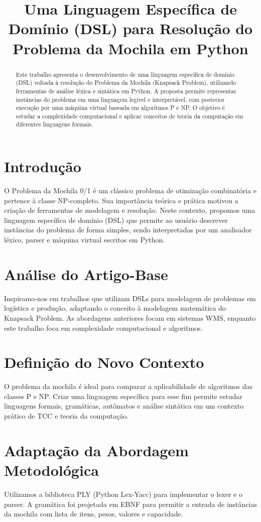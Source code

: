 \documentclass[conference]{IEEEtran}
\title{Uma Linguagem Específica de Domínio (DSL) para Resolução do Problema da Mochila em Python}
\author{
    \IEEEauthorblockN{Guilherme Cavenaghi}
    \IEEEauthorblockA{Centro Universitário FHO \\ guilherme.cavenaghi@fho.edu.br}
}
\begin{document}
\maketitle

\begin{abstract}
Este trabalho apresenta o desenvolvimento de uma linguagem específica de domínio (DSL) voltada à resolução do Problema da Mochila (Knapsack Problem), utilizando ferramentas de análise léxica e sintática em Python. A proposta permite representar instâncias do problema em uma linguagem legível e interpretável, com posterior execução por uma máquina virtual baseada em algoritmos P e NP. O objetivo é estudar a complexidade computacional e aplicar conceitos de teoria da computação em diferentes linguagens formais.
\end{abstract}

\section{Introdução}
O Problema da Mochila 0/1 é um clássico problema de otimização combinatória e pertence à classe NP-completo. Sua importância teórica e prática motivou a criação de ferramentas de modelagem e resolução. Neste contexto, propomos uma linguagem específica de domínio (DSL) que permite ao usuário descrever instâncias do problema de forma simples, sendo interpretadas por um analisador léxico, parser e máquina virtual escritos em Python.

\section{Análise do Artigo-Base}
Inspiramo-nos em trabalhos que utilizam DSLs para modelagem de problemas em logística e produção, adaptando o conceito à modelagem matemática do Knapsack Problem. As abordagens anteriores focam em sistemas WMS, enquanto este trabalho foca em complexidade computacional e algoritmos.

\section{Definição do Novo Contexto}
O problema da mochila é ideal para comparar a aplicabilidade de algoritmos das classes P e NP. Criar uma linguagem específica para esse fim permite estudar linguagens formais, gramáticas, autômatos e análise sintática em um contexto prático de TCC e teoria da computação.

\section{Adaptação da Abordagem Metodológica}
Utilizamos a biblioteca PLY (Python Lex-Yacc) para implementar o lexer e o parser. A gramática foi projetada em EBNF para permitir a entrada de instâncias da mochila com lista de itens, pesos, valores e capacidade.
\end{document}
